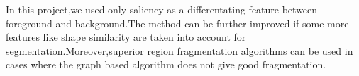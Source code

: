 \documentclass{article}
\begin{document}
In this project,we used only saliency as a differentating feature between foreground and background.The method can be further improved if some more features like shape similarity are taken into account for segmentation.Moreover,superior region fragmentation algorithms can be used in cases where the graph based algorithm does not give good fragmentation.\\\\
\newpage


\end{document}
